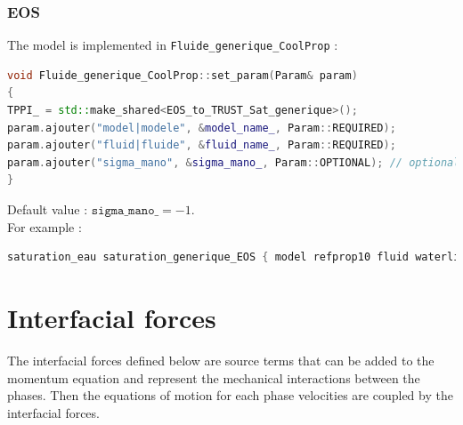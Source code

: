 \subsubsection{EOS}
The model is implemented in \texttt{Fluide\_generique\_CoolProp} :
\begin{lstlisting}[language=c++]
void Fluide_generique_CoolProp::set_param(Param& param)
{
TPPI_ = std::make_shared<EOS_to_TRUST_Sat_generique>();
param.ajouter("model|modele", &model_name_, Param::REQUIRED);
param.ajouter("fluid|fluide", &fluid_name_, Param::REQUIRED);
param.ajouter("sigma_mano", &sigma_mano_, Param::OPTIONAL); // optional : because of issues when we call surface tension in TTSE in coolprop ! Try without and if calculation doesn't pass, input sigma
}
\end{lstlisting}
Default value : $\texttt{sigma\_mano\_}=-1.$\\
For example :
\begin{lstlisting}[language=c++]
saturation_eau saturation_generique_EOS { model refprop10 fluid waterliquid }
\end{lstlisting}

\section{Interfacial forces\label{sec:interfa-forces}}
The interfacial forces defined below are source terms that can be added to the momentum equation and represent the mechanical interactions between the phases. Then the equations of motion for each phase velocities are coupled by the interfacial forces.

